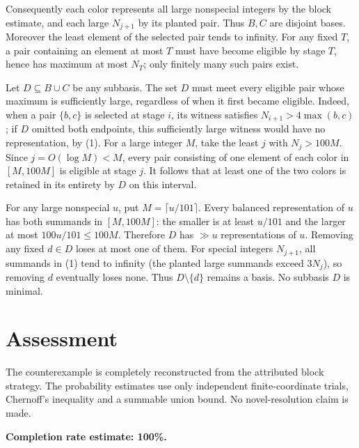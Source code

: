 \documentclass[11pt]{article}
\begin{document}
Consequently each color represents all large nonspecial integers by the block estimate, and each large $N_{j+1}$ by its planted pair. Thus $B,C$ are disjoint bases. Moreover the least element of the selected pair tends to infinity. For any fixed $T$, a pair containing an element at most $T$ must have become eligible by stage $T$, hence has maximum at most $N_T$; only finitely many such pairs exist.

Let $D\subseteq B\cup C$ be any subbasis. The set $D$ must meet every eligible pair whose maximum is sufficiently large, regardless of when it first became eligible. Indeed, when a pair $\{b,c\}$ is selected at stage $i$, its witness satisfies $N_{i+1}>4\max(b,c)$; if $D$ omitted both endpoints, this sufficiently large witness would have no representation, by (1). For a large integer $M$, take the least $j$ with $N_j>100M$. Since $j=O(\log M)<M$, every pair consisting of one element of each color in $[M,100M]$ is eligible at stage $j$. It follows that at least one of the two colors is retained in its entirety by $D$ on this interval.

For any large nonspecial $u$, put $M=\lceil u/101\rceil$. Every balanced representation of $u$ has both summands in $[M,100M]$: the smaller is at least $u/101$ and the larger at most $100u/101\le100M$. Therefore $D$ has $\gg u$ representations of $u$. Removing any fixed $d\in D$ loses at most one of them. For special integers $N_{j+1}$, all summands in (1) tend to infinity (the planted large summands exceed $3N_j$), so removing $d$ eventually loses none. Thus $D\setminus\{d\}$ remains a basis. No subbasis $D$ is minimal.

\section*{Assessment}
The counterexample is completely reconstructed from the attributed block strategy. The probability estimates use only independent finite-coordinate trials, Chernoff's inequality and a summable union bound. No novel-resolution claim is made.

\textbf{Completion rate estimate: 100\%.}
\end{document}
